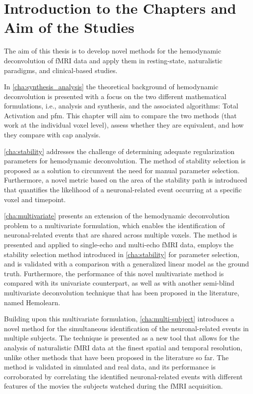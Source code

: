 \section{Introduction to the Chapters and Aim of the Studies}

The aim of this thesis is to develop novel methods for the hemodynamic
deconvolution of fMRI data and apply them in resting-state, naturalistic
paradigms, and clinical-based studies. 

In \cref{cha:synthesis_analysis} the theoretical background of hemodynamic
deconvolution is presented with a focus on the two different mathematical
formulations, i.e., analysis and synthesis, and the associated algorithms: Total
Activation and \acrlong*{pfm}. This chapter will aim to compare the two methods
(that work at the individual voxel level), assess whether they are equivalent,
and how they compare with \acrlong*{cap} analysis.

\cref{cha:stability} addresses the challenge of determining adequate
regularization parameters for hemodynamic deconvolution. The method of stability
selection is proposed as a solution to circumvent the need for manual parameter
selection. Furthermore, a novel metric based on the area of the stability path
is introduced that quantifies the likelihood of a neuronal-related event
occurring at a specific voxel and timepoint.

\cref{cha:multivariate} presents an extension of the hemodynamic deconvolution
problem to a multivariate formulation, which enables the identification of
neuronal-related events that are shared across multiple voxels. The method is
presented and applied to single-echo and multi-echo fMRI data, employs the
stability selection method introduced in \cref{cha:stability} for parameter
selection, and is validated with a comparison with a generalized linear model as
the ground truth. Furthermore, the performance of this novel multivariate method
is compared with its univariate counterpart, as well as with another semi-blind
multivariate deconvolution technique that has been proposed in the literature,
named Hemolearn.

Building upon this multivariate formulation, \cref{cha:multi-subject} introduces
a novel method for the simultaneous identification of the neuronal-related
events in multiple subjects. The technique is presented as a new tool that
allows for the analysis of naturalistic fMRI data at the finest spatial and
temporal resolution, unlike other methods that have been proposed in the
literature so far. The method is validated in simulated and real data, and its
performance is corroborated by correlating the identified neuronal-related
events with different features of the movies the subjects watched during the
fMRI acquisition.

